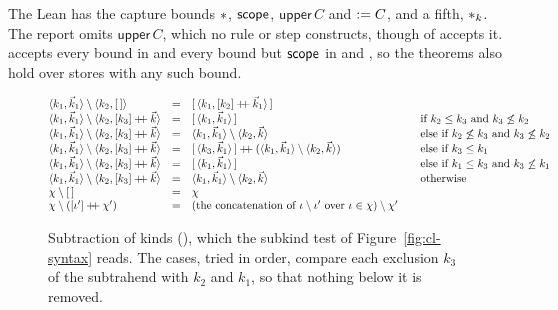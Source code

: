 The Lean has the capture bounds $\ast$, $\mathsf{scope}$, $\mathsf{upper}\,C$ and $\mathrel{:=}C$, and \treeCL a fifth, $\ast_{k}$. The report omits $\mathsf{upper}\,C$, which no rule or step constructs, though  of \treeCL accepts it.  accepts every bound in \treeK and every bound but $\mathsf{scope}$ in \treeCC and \treeCL, so the theorems also hold over stores with any such bound.

\begin{figure}[b]
\footnotesize
\color{tgtcol}
\[
\begin{array}{@{}lcl@{\qquad}l@{}}
\langle k_1, \vec{k}_1\rangle \setminus \langle k_2, [\,]\rangle & = & [\,\langle k_1, [k_2] \mathbin{+\!\!+} \vec{k}_1\rangle\,] \\
\langle k_1, \vec{k}_1\rangle \setminus \langle k_2, [k_3] \mathbin{+\!\!+} \vec{k}\rangle & = & [\,\langle k_1, \vec{k}_1\rangle\,] & \text{if } k_2 \le k_3 \text{ and } k_3 \not\le k_2 \\
\langle k_1, \vec{k}_1\rangle \setminus \langle k_2, [k_3] \mathbin{+\!\!+} \vec{k}\rangle & = & \langle k_1, \vec{k}_1\rangle \setminus \langle k_2, \vec{k}\rangle & \text{else if } k_2 \not\le k_3 \text{ and } k_3 \not\le k_2 \\
\langle k_1, \vec{k}_1\rangle \setminus \langle k_2, [k_3] \mathbin{+\!\!+} \vec{k}\rangle & = & [\,\langle k_3, \vec{k}_1\rangle\,] \mathbin{+\!\!+} (\langle k_1, \vec{k}_1\rangle \setminus \langle k_2, \vec{k}\rangle) & \text{else if } k_3 \le k_1 \\
\langle k_1, \vec{k}_1\rangle \setminus \langle k_2, [k_3] \mathbin{+\!\!+} \vec{k}\rangle & = & [\,\langle k_1, \vec{k}_1\rangle\,] & \text{else if } k_1 \le k_3 \text{ and } k_3 \not\le k_1 \\
\langle k_1, \vec{k}_1\rangle \setminus \langle k_2, [k_3] \mathbin{+\!\!+} \vec{k}\rangle & = & \langle k_1, \vec{k}_1\rangle \setminus \langle k_2, \vec{k}\rangle & \text{otherwise} \\
\chi \setminus [\,] & = & \chi \\
\chi \setminus ([\iota'] \mathbin{+\!\!+} \chi') & = & (\text{the concatenation of } \iota \setminus \iota' \text{ over } \iota \in \chi) \setminus \chi'
\end{array}
\]
\color{black}
\caption{Subtraction of kinds (), which the subkind test of Figure~\ref{fig:cl-syntax} reads. The cases, tried in order, compare each exclusion $k_3$ of the subtrahend with $k_2$ and $k_1$, so that nothing below it is removed.}
\label{fig:mech-subtract}
\end{figure}

